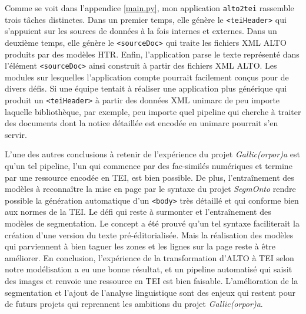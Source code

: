 \documentclass[class=article, crop=false]{standalone}
\begin{document}
Comme se voit dans l'appendice \ref{main.py}, mon application \texttt{alto2tei} rassemble trois tâches distinctes. Dans un premier temps, elle génère le \texttt{<teiHeader>} qui s'appuient sur les sources de données à la fois internes et externes. Dans un deuxième temps, elle génère le \texttt{<sourceDoc>} qui traite les fichiers \acrshort{XML} \acrshort{ALTO} produits par des modèles \acrshort{HTR}. Enfin, l'application parse le texte représenté dans l'élément \texttt{<sourceDoc>} ainsi construit à partir des fichiers \acrshort{XML} \acrshort{ALTO}. Les modules sur lesquelles l'application compte pourrait facilement conçus pour de divers défis. Si une équipe tentait à réaliser une application plus générique qui produit un \texttt{<teiHeader>} à partir des données \acrshort{XML} \Gls{unimarc} de peu importe laquelle bibliothèque, par exemple, peu importe quel pipeline qui cherche à traiter des documents dont la notice détaillée est encodée en \Gls{unimarc} pourrait s'en servir.

L'une des autres conclusions à retenir de l'expérience du projet \textit{Gallic(orpor)a} est qu'un tel pipeline, l'un qui commence par des fac-similés numériques et termine par une ressource encodée en \acrshort{TEI}, est bien possible. De plus, l'entraînement des modèles à reconnaître la mise en page par le syntaxe du projet \textit{SegmOnto} rendre possible la génération automatique d'un \texttt{<body>} très détaillé et qui conforme bien aux normes de la \acrshort{TEI}. Le défi qui reste à surmonter et l'entraînement des modèles de segmentation. Le concept  a été prouvé qu'un tel syntaxe faciliterait la création d'une version du texte pré-éditorialisée. Mais la réalisation des modèles qui parviennent à bien taguer les zones et les lignes sur la page reste à être améliorer. En conclusion, l'expérience de la transformation d'\acrshort{ALTO} à \acrshort{TEI} selon notre modélisation a eu une bonne résultat, et un pipeline automatisé qui saisit des images et renvoie une ressource en \acrshort{TEI} est bien faisable. L'amélioration de la segmentation et l'ajout de l'analyse linguistique sont des enjeux qui restent pour de futurs projets qui reprennent les ambitions du projet \textit{Gallic(orpor)a}.
\end{document}
